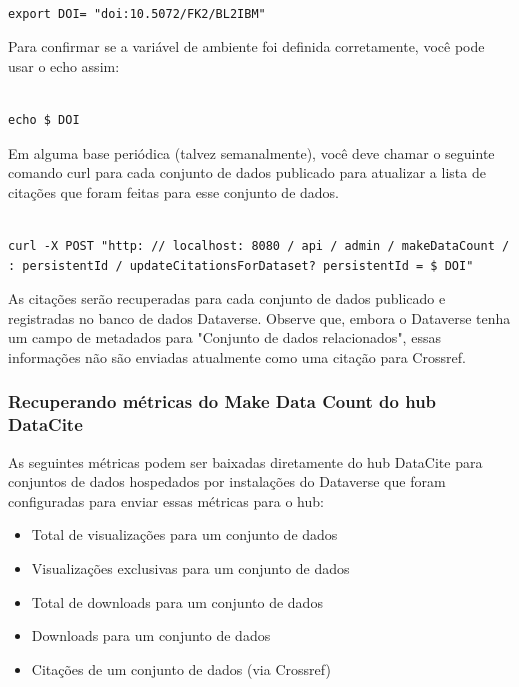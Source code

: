 \documentclass[12pt,hidelinks]{article}
\begin{document}
\begin{verbatim}

export DOI= "doi:10.5072/FK2/BL2IBM"

\end{verbatim}

Para confirmar se a variável de ambiente foi definida corretamente, você pode usar o echo assim:

\begin{verbatim}

echo $ DOI

\end{verbatim}

Em alguma base periódica (talvez semanalmente), você deve chamar o seguinte comando curl para cada conjunto de dados publicado para atualizar a lista de citações que foram feitas para esse conjunto de dados.

\begin{verbatim}

curl -X POST "http: // localhost: 8080 / api / admin / makeDataCount /
: persistentId / updateCitationsForDataset? persistentId = $ DOI"

\end{verbatim}

As citações serão recuperadas para cada conjunto de dados publicado e registradas no banco de dados Dataverse. Observe que, embora o Dataverse tenha um campo de metadados para "Conjunto de dados relacionados", essas informações não são enviadas atualmente como uma citação para Crossref.

\subsubsection{Recuperando métricas do Make Data Count do hub DataCite}

\qquad As seguintes métricas podem ser baixadas diretamente do hub DataCite para conjuntos de dados hospedados por instalações do Dataverse que foram configuradas para enviar essas métricas para o hub:

\begin{itemize}

    \item Total de visualizações para um conjunto de dados
    \item Visualizações exclusivas para um conjunto de dados
    \item Total de downloads para um conjunto de dados
    \item Downloads para um conjunto de dados
    \item Citações de um conjunto de dados (via Crossref)

\end{itemize}
\end{document}

